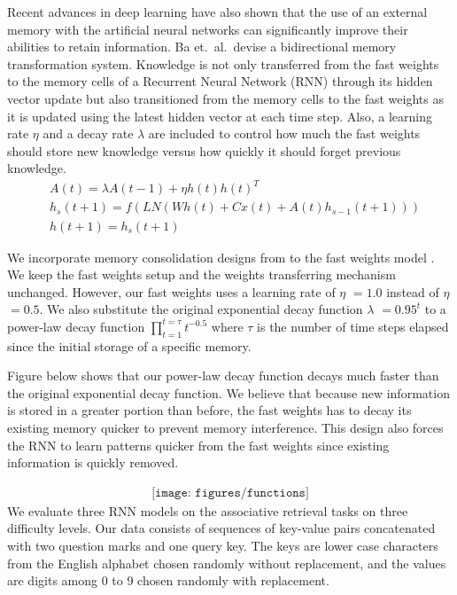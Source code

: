 \documentclass[portrait,a0b,final,a4resizeable]{include/a0poster}
\begin{document}
\begin{poster}
\begin{multicols}{3}
Recent advances in deep learning \cite{dnc, fw} have also shown that the use of an external memory with the artificial neural networks can significantly improve their abilities to retain information.
Ba et.\ al.\ devise a bidirectional memory transformation system.
Knowledge is not only transferred from the fast weights to the memory cells of a Recurrent Neural Network (RNN) through its hidden vector update but also transitioned from the memory cells to the fast weights as it is updated using the latest hidden vector at each time step.
Also, a learning rate $\eta$ and a decay rate $\lambda$ are included to control how much the fast weights should store new knowledge versus how quickly it should forget previous knowledge.
%
\vspace{0.25in}
\begin{align}
    &A(t) = \lambda A(t-1) + \eta h(t) h(t)^T
    \label{eq:external_memory} \\
    &h_s(t+1) = f(LN(Wh(t) + Cx(t) + A(t)h_{s-1}(t+1)))
    \label{eq:hidden_update} \\
    &h(t+1) = h_s(t+1) \label{eq:hidden_assign}
\end{align}
\vspace{1cm}

We incorporate memory consolidation designs from \cite{pld} to the fast weights model \cite{fw}.
We keep the fast weights setup and the weights transferring mechanism unchanged.
However, our fast weights uses a learning rate of $\eta$ $=1.0$ instead of $\eta$ $=0.5$.
We also substitute the original exponential decay function $\lambda$ $=0.95^t$ to a power-law decay function $\prod_{t=1}^{t=\tau} t^{-0.5}$ where $\tau$ is the number of time steps elapsed since the initial storage of a specific memory. 
 

\newpage 
{}
 \vspace{-0.05cm}

Figure below shows that our power-law decay function decays much faster than the original exponential decay function. 
We believe that because new information is stored in a greater portion than before, the fast weights has to decay its existing memory quicker to prevent memory interference. 
This design also forces the RNN to learn patterns quicker from the fast weights since existing information is quickly removed.

\vspace{-0.75in}
\begin{align*}
 \texttt{[image: figures/functions]}
\end{align*}
% 
We evaluate three RNN models on the associative retrieval tasks on three difficulty levels.
Our data consists of sequences of key-value pairs concatenated with two question marks and one query key.
The keys are lower case characters from the English alphabet chosen randomly without replacement, and the values are digits among 0 to 9 chosen randomly with replacement. \\


\end{multicols}
\end{poster}
\end{document}
